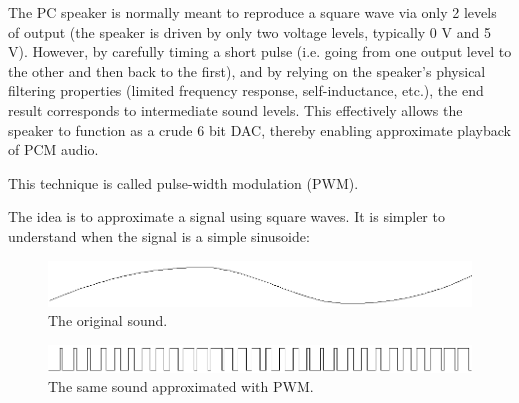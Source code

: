 \par
 \begin{fancyquotes}
  The PC speaker is normally meant to reproduce a square wave via only 2 levels of output (the speaker is driven by only two voltage levels, typically 0 V and 5 V). However, by carefully timing a short pulse (i.e. going from one output level to the other and then back to the first), and by relying on the speaker's physical filtering properties (limited frequency response, self-inductance, etc.), the end result corresponds to intermediate sound levels. This effectively allows the speaker to function as a crude 6 bit DAC, thereby enabling approximate playback of PCM audio.\\
  \par
  This technique is called pulse-width modulation (PWM).
 \end{fancyquotes}
\par
  
The idea is to approximate a signal using square waves. It is simpler to understand when the signal is a simple sinusoide:
\par
\begin{figure}[H]
\centering
 \includegraphics[width=\textwidth]{imgs/drawings/pwm/sinuois.png}
 \caption{The original sound.}
 \end{figure}
\par

\par
\begin{figure}[H]
\centering
 \includegraphics[width=\textwidth]{imgs/drawings/pwm/pwm_approximation.png}
 \caption{The same sound approximated with PWM.}
 \end{figure}
\par

